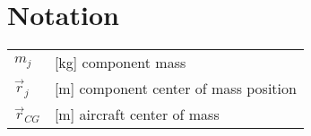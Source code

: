 \clearpage %
{}
\chapter*{Notation}
\markright{}

\begin{longtable}[l]{ l p{} }
  $m_j$          & [kg] component mass \\
  $\vec{r}_j$    & [m] component center of mass position \\
  $\vec{r}_{CG}$ & [m] aircraft center of mass \\
\end{longtable}
